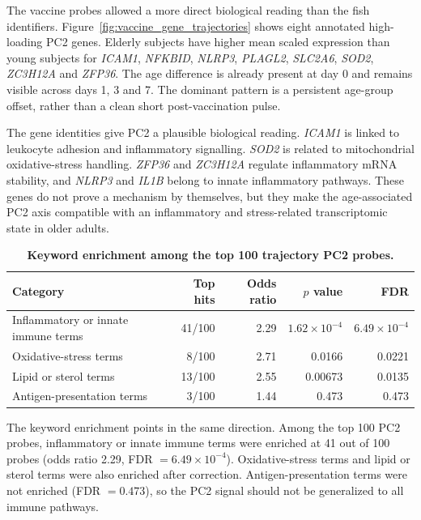 \documentclass[11pt,a4paper]{article}
\begin{document}
The vaccine probes allowed a more direct biological reading than the fish identifiers. Figure~\ref{fig:vaccine_gene_trajectories} shows eight annotated high-loading PC2 genes. Elderly subjects have higher mean scaled expression than young subjects for \textit{ICAM1}, \textit{NFKBID}, \textit{NLRP3}, \textit{PLAGL2}, \textit{SLC2A6}, \textit{SOD2}, \textit{ZC3H12A} and \textit{ZFP36}. The age difference is already present at day 0 and remains visible across days 1, 3 and 7. The dominant pattern is a persistent age-group offset, rather than a clean short post-vaccination pulse.

The gene identities give PC2 a plausible biological reading. \textit{ICAM1} is linked to leukocyte adhesion and inflammatory signalling. \textit{SOD2} is related to mitochondrial oxidative-stress handling. \textit{ZFP36} and \textit{ZC3H12A} regulate inflammatory mRNA stability, and \textit{NLRP3} and \textit{IL1B} belong to innate inflammatory pathways. These genes do not prove a mechanism by themselves, but they make the age-associated PC2 axis compatible with an inflammatory and stress-related transcriptomic state in older adults.

\begin{table}[!htbp]
  \centering
  \caption{\textbf{Keyword enrichment among the top 100 trajectory PC2 probes.}}
  \label{tab:vaccine_keyword}
  \footnotesize
  \begin{tabular}{lrrrr}
    \toprule
    Category & Top hits & Odds ratio & $p$ value & FDR \\
    \midrule
    Inflammatory or innate immune terms & 41/100 & 2.29 & $1.62\times10^{-4}$ & $6.49\times10^{-4}$ \\
    Oxidative-stress terms & 8/100 & 2.71 & 0.0166 & 0.0221 \\
    Lipid or sterol terms & 13/100 & 2.55 & 0.00673 & 0.0135 \\
    Antigen-presentation terms & 3/100 & 1.44 & 0.473 & 0.473 \\
    \bottomrule
  \end{tabular}
\end{table}

The keyword enrichment points in the same direction. Among the top 100 PC2 probes, inflammatory or innate immune terms were enriched at 41 out of 100 probes (odds ratio 2.29, FDR $=6.49\times10^{-4}$). Oxidative-stress terms and lipid or sterol terms were also enriched after correction. Antigen-presentation terms were not enriched (FDR $=0.473$), so the PC2 signal should not be generalized to all immune pathways.
\end{document}
